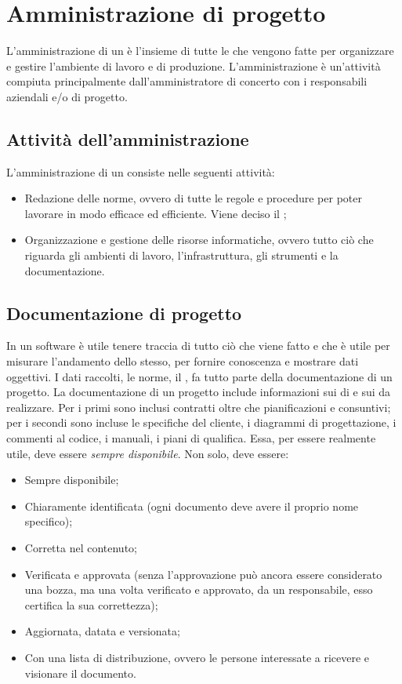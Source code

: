 \documentclass[../main]{subfiles}
\begin{document}
\section{Amministrazione di progetto}
L'amministrazione di un  è l'insieme di tutte le  che vengono fatte per organizzare e gestire l'ambiente di lavoro e di produzione.
L'amministrazione è un'attività compiuta principalmente dall'amministratore di concerto con i responsabili aziendali e/o di progetto.
\subsection{Attività dell'amministrazione}
L'amministrazione di un  consiste nelle seguenti attività:
\begin{itemize}
    \item Redazione delle norme, ovvero di tutte le regole e procedure per poter lavorare in modo efficace ed efficiente. Viene deciso il ;
    \item Organizzazione e gestione delle risorse informatiche, ovvero tutto ciò che riguarda gli ambienti di lavoro, l'infrastruttura, gli strumenti e la documentazione.
\end{itemize}
\subsection{Documentazione di progetto}
In un  software è utile tenere traccia di tutto ciò che viene fatto e che è utile per misurare l'andamento dello stesso, per fornire conoscenza e mostrare dati oggettivi. I dati raccolti, le norme, il , fa tutto parte della documentazione di un progetto.\newline
La documentazione di un progetto include informazioni sui  di  e sui  da realizzare. Per i primi sono inclusi contratti oltre che pianificazioni e consuntivi; per i secondi sono incluse le specifiche del cliente, i diagrammi di progettazione, i commenti al codice, i manuali, i piani di qualifica.
Essa, per essere realmente utile, deve essere \textit{sempre disponibile}. Non solo, deve essere:
\begin{itemize}
    \item Sempre disponibile;
    \item Chiaramente identificata (ogni documento deve avere il proprio nome specifico);
    \item Corretta nel contenuto;
    \item Verificata e approvata (senza l'approvazione può ancora essere considerato una bozza, ma una volta verificato e approvato, da un responsabile, esso certifica la sua correttezza);
    \item Aggiornata, datata e versionata;
    \item Con una lista di distribuzione, ovvero le persone interessate a ricevere e visionare il documento.
\end{itemize}
\end{document}
